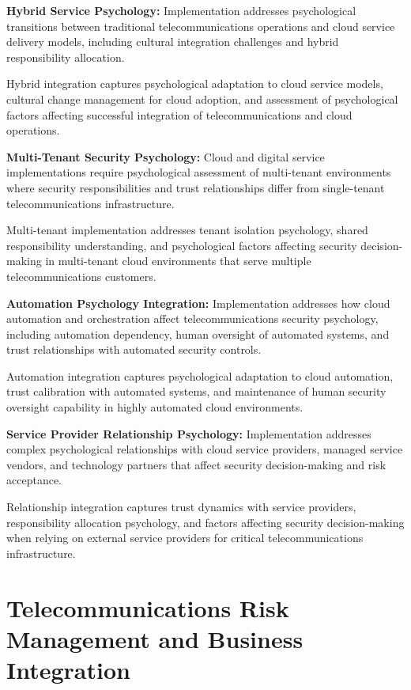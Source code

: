 \documentclass[10pt, twocolumn]{article}
\begin{document}
\textbf{Hybrid Service Psychology:} Implementation addresses psychological transitions between traditional telecommunications operations and cloud service delivery models, including cultural integration challenges and hybrid responsibility allocation.

Hybrid integration captures psychological adaptation to cloud service models, cultural change management for cloud adoption, and assessment of psychological factors affecting successful integration of telecommunications and cloud operations.

\textbf{Multi-Tenant Security Psychology:} Cloud and digital service implementations require psychological assessment of multi-tenant environments where security responsibilities and trust relationships differ from single-tenant telecommunications infrastructure.

Multi-tenant implementation addresses tenant isolation psychology, shared responsibility understanding, and psychological factors affecting security decision-making in multi-tenant cloud environments that serve multiple telecommunications customers.

\textbf{Automation Psychology Integration:} Implementation addresses how cloud automation and orchestration affect telecommunications security psychology, including automation dependency, human oversight of automated systems, and trust relationships with automated security controls.

Automation integration captures psychological adaptation to cloud automation, trust calibration with automated systems, and maintenance of human security oversight capability in highly automated cloud environments.

\textbf{Service Provider Relationship Psychology:} Implementation addresses complex psychological relationships with cloud service providers, managed service vendors, and technology partners that affect security decision-making and risk acceptance.

Relationship integration captures trust dynamics with service providers, responsibility allocation psychology, and factors affecting security decision-making when relying on external service providers for critical telecommunications infrastructure.

\section{Telecommunications Risk Management and Business Integration}
\end{document}
